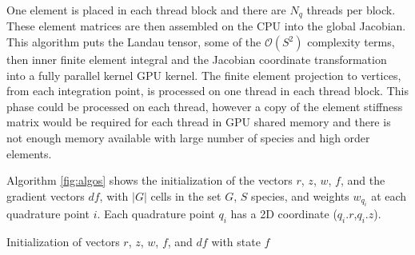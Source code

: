 \documentclass[12pt]{siamart}
\newcommand{\Order}[1]{\ensuremath{\mathcal{O}(#1)}}    %
\begin{document}
One element is placed in each thread block and there are $N_q$ threads per block.
These element matrices are then assembled on the CPU into the global Jacobian.
This algorithm puts the Landau tensor, some of the $\Order{S^2}$ complexity terms, then inner finite element integral and the Jacobian coordinate transformation into a fully parallel kernel GPU kernel.
The finite element projection to vertices, from each integration point, is processed on one thread in each thread block.
This phase could be processed on each thread, however a copy of the element stiffness matrix would be required for each thread in GPU shared memory and there is not enough memory available with large number of species and high order elements.

Algorithm \ref{fig:algos}
shows the initialization of the vectors $r$, $z$, $w$, $f$, and the
gradient vectors $df$, with $|G|$ cells in the set
$G$, $S$ species, and weights $w_{q_i}$ at each quadrature point $i$.
Each quadrature point $q_i$ has a 2D coordinate ($q_i.r$,$q_i.z$).
\begin{algorithm}[h!]
\begin{algorithmic}[100]
\ENDFOR
\ENDFOR
\ENDFOR
\end{algorithmic} 
\caption{Initialization of vectors $r$, $z$, $w$, $f$, and $df$ with state $f$}
\label{fig:algos}
\end{algorithm}
\end{document}
